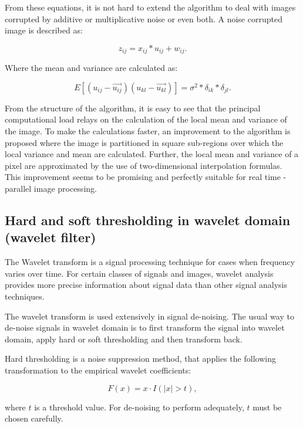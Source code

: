 From these equations, it is not hard to extend the algorithm to deal with images corrupted by additive or multiplicative noise or even both. A noise corrupted image is described as: 

\begin{equation}
z_{ij} = x_{ij}*u_{ij} + w_{ij}.
    \label{eq:ls_filter_3}
\end{equation}

Where the mean and variance are calculated as:

\begin{equation}
    E[(u_{ij} - \vec{u_{ij}})( u_{kl} -\vec{u_{kl}})] = \sigma^2*\delta_{ik}*\delta_{jl}.
    \label{eq:ls_filter_4}
\end{equation}

From the structure of the algorithm, it is easy to see that the principal computational load relays on the calculation of the local mean and variance of the image. To make the calculations faster, an improvement to the algorithm is proposed where the image is partitioned in square sub-regions over which the local variance and mean are calculated. Further, the local mean and variance of a pixel are approximated by the use of two-dimensional interpolation formulas. This improvement seems to be promising and perfectly suitable for real time -parallel image processing.

\subsection{Hard and soft thresholding in wavelet domain (wavelet filter)}
The Wavelet transform is a signal processing technique for cases when frequency varies over time. For certain classes of signals and images, wavelet analysis provides more precise information about signal data than other signal analysis techniques.

The wavelet transform is used extensively in signal de-noising. The usual way to de-noise signals in wavelet domain is to first transform the signal into wavelet domain, apply hard or soft thresholding and then transform back. 

Hard thresholding is a noise suppression method, that applies the following transformation to the empirical wavelet coefficients:

\begin{equation}
    F(x)=x\cdot I(|x|>t),
    \label{eq:wavelet_1}
\end{equation}

where $t$ is a threshold value. For de-noising to perform adequately, $t$ must be chosen carefully.

